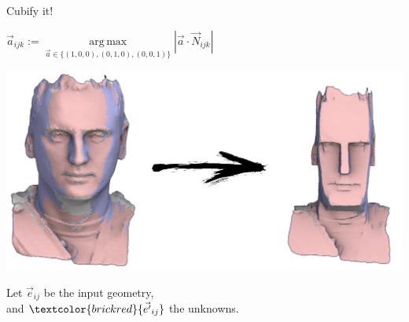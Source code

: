 \documentclass[UKenglish,aspectratio=169]{beamer}
\DeclareMathOperator*{\argmax}{arg\,max}
\newcommand\unknown[1]{\textcolor{brickred}{#1}}
\begin{document}
\begin{frame}{Cubify it!}
\begin{minipage}[t]{.4\linewidth}
\strut\vspace*{-\baselineskip}\newline
$\vec{a}_{ijk} := \argmax\limits_{\vec{a}\in \{(1,0,0), (0,1,0), (0,0,1)\}} \left|\vec{a} \cdot \vec{N}_{ijk}\right|$

\includegraphics[width=\linewidth]{../manuscript/img/cubify-flagging.jpg}
\pause
{}
\end{minipage}
\quad
\begin{minipage}[t]{.5\linewidth}
\strut\vspace*{-\baselineskip}\newline
Let $\vec{e}_{ij}$ be the input geometry, \\ and $\unknown{\vec{e'}_{ij}}$ the unknowns.


\end{minipage}
\end{frame}
\end{document}
